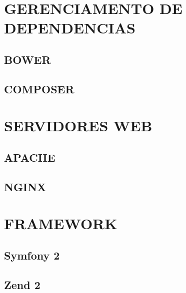 \documentclass[12pt,floatnumber=continuous,espaco=umemeio]{abnt}
\begin{document}
 
	
	\capa 
	\folhaderosto 
	
	
  
	
	\indices

	
	
	
	
	
	
	
	
	
	\newpage
	
	\chapter{GERENCIAMENTO DE DEPENDENCIAS}
	\section{BOWER}
	\section{COMPOSER}
	
	\chapter{SERVIDORES WEB}
	\section{APACHE}
	\section{NGINX}
	
	\chapter{FRAMEWORK}
	\section{Symfony 2}
	\section{Zend 2}
	
	
	
	 
	
\end{document}
